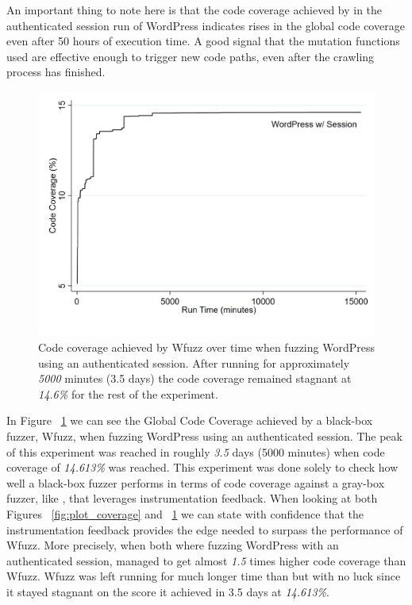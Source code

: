 An important thing to note here is that the code coverage achieved by \pname{} in the authenticated session run of WordPress indicates rises in the global code coverage even after 50 hours of execution time. A good signal that the mutation functions used are effective enough to trigger new code paths, even after the crawling process has finished.
 
\begin{figure}[!htb]
  \centering \includegraphics[width=\linewidth]{figures/plot_coverage2.pdf}
  \caption{Code coverage achieved by Wfuzz over time when fuzzing WordPress using an authenticated session. After running for approximately \emph{5000} minutes (3.5 days) the code coverage remained stagnant at \emph{14.6\%} for the rest of the experiment.}
  \label{fig:plot_coverage2}
\end{figure}

In Figure ~\ref{fig:plot_coverage2} we can see the Global Code Coverage achieved by a black-box fuzzer, Wfuzz, when fuzzing WordPress using an authenticated session. The peak of this experiment was reached in roughly \emph{3.5} days (5000 minutes) when code coverage of \emph{14.613\%} was reached. This experiment was done solely to check how well a black-box fuzzer performs in terms of code coverage against a gray-box fuzzer, like \pname{}, that leverages instrumentation feedback. When looking at both Figures ~\ref{fig:plot_coverage} and ~\ref{fig:plot_coverage2} we can state with confidence that the instrumentation feedback provides \pname{} the edge needed to surpass the performance of Wfuzz. More precisely, when both where fuzzing WordPress with an authenticated session, \pname{} managed to get almost \emph{1.5} times higher code coverage than Wfuzz. Wfuzz was left running for much longer time than \pname{} but with no luck since it stayed stagnant on the score it achieved in 3.5 days at \emph{14.613\%}.
